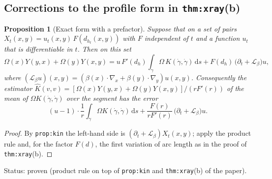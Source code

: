 \documentclass[a4paper,11pt]{article}
\newtheorem{proposition}[theorem]{Proposition}
\theoremstyle{definition}
\theoremstyle{remark}
\newcommand{\dd}{\mathrm{d}}
\newcommand{\Lie}{\mathcal{L}}
\newcommand{\status}[1]{\par\noindent\textsf{\small Status: #1}\par}
\begin{document}
\subsection{Corrections to the profile form in \texttt{thm:xray}(b)}

\begin{proposition}[Exact form with a prefactor]\label{prop:prefactor}
Suppose that on a set of pairs $X_t(x,y)=u_t(x,y)\,F(d_{h_t}(x,y))$ with $F$ independent of $t$ and a function $u_t$ that is differentiable in $t$. Then on this set
\[
\Omega(x)Y(y,x)+\Omega(y)Y(x,y)=u\,F'(d_h)\int_\gamma\Omega\,K(\dot\gamma,\dot\gamma)\,\dd s+F(d_h)\,\big(\partial_t+\Lie_\beta\big)u ,
\]
where $(\Lie_\beta u)(x,y)=(\beta(x)\cdot\nabla_x+\beta(y)\cdot\nabla_y)u(x,y)$. Consequently the estimator $\hat K(v,v)=[\Omega(x)Y(y,x)+\Omega(y)Y(x,y)]/(rF'(r))$ of the mean of $\Omega K(\dot\gamma,\dot\gamma)$ over the segment has the error
\[
(u-1)\cdot\frac1r\int_\gamma\Omega K(\dot\gamma,\dot\gamma)\,\dd s+\frac{F(r)}{rF'(r)}\,\big(\partial_t+\Lie_\beta\big)u .
\]
\end{proposition}

\begin{proof}
By \texttt{prop:kin} the left-hand side is $(\partial_t+\Lie_\beta)X_t(x,y)$; apply the product rule and, for the factor $F(d)$, the first variation of arc length as in the proof of \texttt{thm:xray}(b).
\end{proof}
\status{proven (product rule on top of \texttt{prop:kin} and \texttt{thm:xray}(b) of the paper).}
\end{document}
